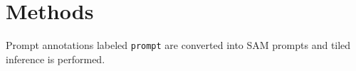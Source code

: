 \section{Methods}
Prompt annotations labeled \texttt{prompt} are converted into SAM prompts and tiled inference is performed.
